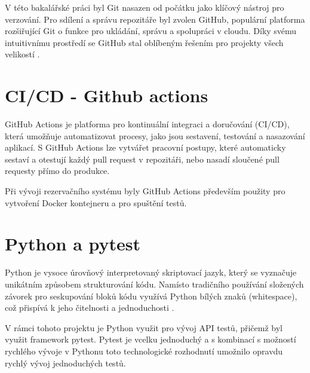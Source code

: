 V této bakalářské práci byl Git nasazen od počátku jako klíčový nástroj pro verzování. Pro sdílení a správu repozitáře byl zvolen GitHub, populární platforma rozšiřující Git o funkce pro ukládání, správu a spolupráci v cloudu. Díky svému intuitivnímu prostředí se GitHub stal oblíbeným řešením pro projekty všech velikostí \cite{githubAboutGitHub}.

\section{CI/CD - Github actions}
GitHub Actions je platforma pro kontinuální integraci a doručování (CI/CD), která umožňuje automatizovat procesy, jako jsou sestavení, testování a nasazování aplikací. S GitHub Actions lze vytvářet pracovní postupy, které automaticky sestaví a otestují každý pull request v repozitáři, nebo nasadí sloučené pull requesty přímo do produkce\cite{githubinc_2024_understanding}.

Při vývoji rezervačního systému byly GitHub Actions především použity pro vytvoření Docker kontejneru a pro spuštění testů.

\section{Python a pytest}
Python je vysoce úrovňový interpretovaný skriptovací jazyk, který se vyznačuje unikátním způsobem strukturování kódu. Namísto tradičního používání složených závorek pro seskupování bloků kódu využívá Python bílých znaků (whitespace), což přispívá k jeho čitelnosti a jednoduchosti \cite{kuhlman2009python, van1990functional}.

V rámci tohoto projektu je Python využit pro vývoj API testů, přičemž byl využit framework pytest. Pytest je vcelku jednoduchý a s kombinací s možností rychlého vývoje v Pythonu toto technologické rozhodnutí umožnilo opravdu rychlý vývoj jednoduchých testů.
